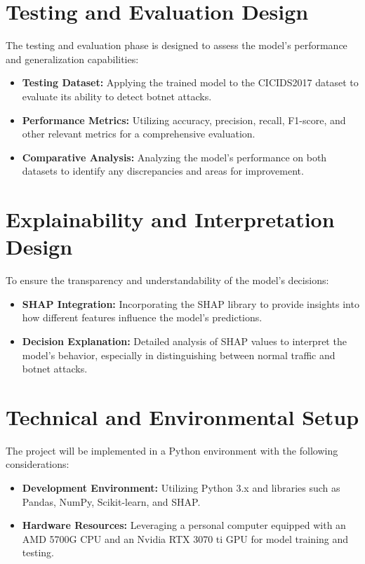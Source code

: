 \section{Testing and Evaluation Design}
The testing and evaluation phase is designed to assess the model's performance and generalization capabilities:

\begin{itemize}
    \item \textbf{Testing Dataset:} Applying the trained model to the CICIDS2017 dataset to evaluate its ability to detect botnet attacks.
    \item \textbf{Performance Metrics:} Utilizing accuracy, precision, recall, F1-score, and other relevant metrics for a comprehensive evaluation.
    \item \textbf{Comparative Analysis:} Analyzing the model's performance on both datasets to identify any discrepancies and areas for improvement.
\end{itemize}

\section{Explainability and Interpretation Design}
To ensure the transparency and understandability of the model's decisions:

\begin{itemize}
    \item \textbf{SHAP Integration:} Incorporating the SHAP library to provide insights into how different features influence the model's predictions.
    \item \textbf{Decision Explanation:} Detailed analysis of SHAP values to interpret the model's behavior, especially in distinguishing between normal traffic and botnet attacks.
\end{itemize}

\section{Technical and Environmental Setup}
The project will be implemented in a Python environment with the following considerations:

\begin{itemize}
    \item \textbf{Development Environment:} Utilizing Python 3.x and libraries such as Pandas, NumPy, Scikit-learn, and SHAP.
    \item \textbf{Hardware Resources:} Leveraging a personal computer equipped with an AMD 5700G CPU and an Nvidia RTX 3070 ti GPU for model training and testing.
\end{itemize}

